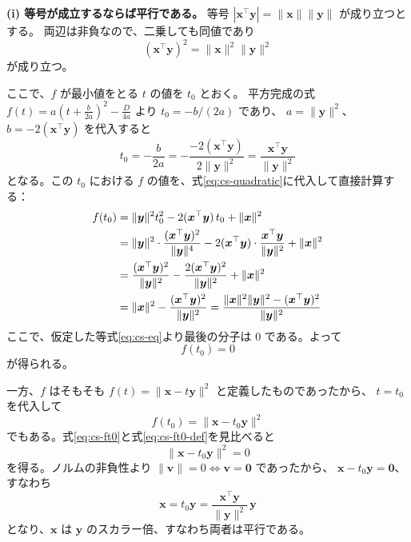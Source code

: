 \textbf{(i) 等号が成立するならば平行である。}\quad
等号 $|\bm{x}^\top \bm{y}| = \|\bm{x}\| \|\bm{y}\|$ が成り立つとする。
両辺は非負なので、二乗しても同値であり
\begin{equation}
  (\bm{x}^\top \bm{y})^2 = \|\bm{x}\|^2 \|\bm{y}\|^2
  \label{eq:cs-eq}
\end{equation}
が成り立つ。

ここで、$f$ が最小値をとる $t$ の値を $t_0$ とおく。
平方完成の式 $f(t) = a(t + \frac{b}{2a})^2 - \frac{D}{4a}$ より $t_0 = -b/(2a)$ であり、
$a = \|\bm{y}\|^2$、$b = -2(\bm{x}^\top \bm{y})$ を代入すると
\begin{equation}
  t_0 = -\frac{b}{2a} = -\frac{-2(\bm{x}^\top \bm{y})}{2\|\bm{y}\|^2}
      = \frac{\bm{x}^\top \bm{y}}{\|\bm{y}\|^2}
\end{equation}
となる。この $t_0$ における $f$ の値を、式\eqref{eq:cs-quadratic}に代入して直接計算する：
\begin{align}
  f(t_0) &= \|\bm{y}\|^2 t_0^2 - 2(\bm{x}^\top \bm{y})\, t_0 + \|\bm{x}\|^2 \notag \\
         &= \|\bm{y}\|^2 \cdot \frac{(\bm{x}^\top \bm{y})^2}{\|\bm{y}\|^4}
            - 2(\bm{x}^\top \bm{y}) \cdot \frac{\bm{x}^\top \bm{y}}{\|\bm{y}\|^2} + \|\bm{x}\|^2 \notag \\
         &= \frac{(\bm{x}^\top \bm{y})^2}{\|\bm{y}\|^2}
            - \frac{2(\bm{x}^\top \bm{y})^2}{\|\bm{y}\|^2} + \|\bm{x}\|^2 \notag \\
         &= \|\bm{x}\|^2 - \frac{(\bm{x}^\top \bm{y})^2}{\|\bm{y}\|^2}
          = \frac{\|\bm{x}\|^2 \|\bm{y}\|^2 - (\bm{x}^\top \bm{y})^2}{\|\bm{y}\|^2}
\end{align}
ここで、仮定した等式\eqref{eq:cs-eq}より最後の分子は $0$ である。よって
\begin{equation}
  f(t_0) = 0
  \label{eq:cs-ft0}
\end{equation}
が得られる。

一方、$f$ はそもそも $f(t) = \|\bm{x} - t\bm{y}\|^2$ と定義したものであったから、
$t = t_0$ を代入して
\begin{equation}
  f(t_0) = \|\bm{x} - t_0 \bm{y}\|^2
  \label{eq:cs-ft0-def}
\end{equation}
でもある。式\eqref{eq:cs-ft0}と式\eqref{eq:cs-ft0-def}を見比べると
\begin{equation}
  \|\bm{x} - t_0 \bm{y}\|^2 = 0
\end{equation}
を得る。ノルムの非負性より $\|\bm{v}\| = 0 \iff \bm{v} = \bm{0}$ であったから、
$\bm{x} - t_0\bm{y} = \bm{0}$、すなわち
\begin{equation}
  \bm{x} = t_0 \bm{y} = \frac{\bm{x}^\top \bm{y}}{\|\bm{y}\|^2} \, \bm{y}
\end{equation}
となり、$\bm{x}$ は $\bm{y}$ のスカラー倍、すなわち両者は平行である。

